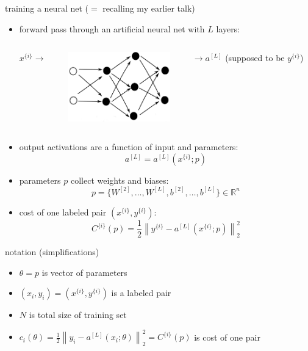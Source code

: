 \documentclass[xcolor={svgnames},
               hyperref={colorlinks,citecolor=DeepPink4,linkcolor=FireBrick,urlcolor=Maroon}]
               {beamer}
\newcommand{\RR}{\mathbb{R}}
\begin{document}
\begin{frame}{training a neural net ($=$ recalling my earlier talk)}

\begin{itemize}
\item forward pass through an artificial neural net with $L$ layers:

\begin{columns}
\begin{column}{0.1\textwidth}
$x^{\{i\}}\to$ 
\end{column}
\begin{column}{0.4\textwidth}
\includegraphics[height=30mm]{figs/cleannet.png}
\end{column}
\begin{column}{0.45\textwidth}
$\to a^{[L]}$ \hfill (supposed to be $y^{\{i\}}$)
\end{column}
\end{columns}

\item output activations are a function of input and parameters:
    $$a^{[L]} = a^{[L]}(x^{\{i\}}; p)$$
\item parameters $p$ collect weights and biases:
    $$p=\{W^{[2]},\dots,W^{[L]},b^{[2]},\dots,b^{[L]}\} \in \RR^n$$
\item cost of one labeled pair $(x^{\{i\}},y^{\{i\}})$:
    $$C^{\{i\}}(p) = \frac{1}{2} \left\|y^{\{i\}} - a^{[L]}(x^{\{i\}}; p)\right\|_2^2$$
\end{itemize}
\end{frame}


\begin{frame}{notation (simplifications)}

\begin{itemize}
\item $\theta = p$ is vector of parameters
\item $(x_i,y_i) = (x^{\{i\}},y^{\{i\}})$ is a labeled pair
\item $N$ is total size of training set
\item $c_i(\theta) = \frac{1}{2} \left\|y_i - a^{[L]}(x_i; \theta)\right\|_2^2 = C^{\{i\}}(p)$ is cost of one pair
\end{itemize}
\end{frame}
\end{document}
